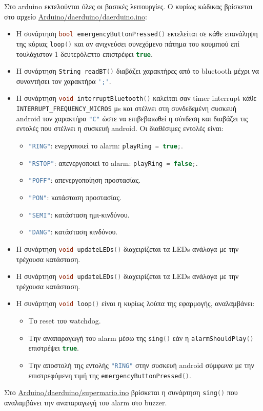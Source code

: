 Στο arduino εκτελούνται όλες οι βασικές λειτουργίες.
Ο κυρίως κώδικας βρίσκεται στο αρχείο \url{Arduino/daerduino/daerduino.ino}:
\begin{itemize}
\item \sloppy Η συνάρτηση \lstinline[language=C++]!bool emergencyButtonPressed()! εκτελείται σε κάθε επανάληψη της κύριας \lstinline[language=C++]!loop()! και αν ανιχνεύσει συνεχόμενο πάτημα του κουμπιού επί τουλάχιστον 1 δευτερόλεπτο επιστρέφει \lstinline[language=C++]!true!.

\item Η συνάρτηση \lstinline[language=C++]!String readBT()! διαβάζει χαρακτήρες από το bluetooth μέχρι να συναντήσει τον χαρακτήρα \lstinline[language=C++]!';'!.

\item \sloppy Η συνάρτηση \lstinline[language=C++]!void interruptBluetooth()! καλείται σαν timer interrupt
κάθε \lstinline[language=C++]!INTERRUPT_FREQUENCY_MICROS! \si{\micro\second}
και στέλνει στη συνδεδεμένη συσκευή android τον χαρακτήρα \lstinline[language=C++]!"C"! ώστε να επιβεβαιωθεί η σύνδεση και διαβάζει τις εντολές που στέλνει η συσκευή android.
Οι διαθέσιμες εντολές είναι:
\begin{itemize}
\item \lstinline[language=C++]!"RING"!: ενεργοποιεί το alarm: \lstinline[language=C++]!playRing = true;!.
\item \lstinline[language=C++]!"RSTOP"!: απενεργοποιεί το alarm: \lstinline[language=C++]!playRing = false;!.
\item \lstinline[language=C++]!"POFF"!: απενεργοποίηση προστασίας.
\item \lstinline[language=C++]!"PON"!: κατάσταση προστασίας.
\item \lstinline[language=C++]!"SEMI"!: κατάσταση ημι-κινδύνου.
\item \lstinline[language=C++]!"DANG"!: κατάσταση κινδύνου.
\end{itemize}

\item Η συνάρτηση \lstinline[language=C++]!void updateLEDs()! διαχειρίζεται τα LEDs ανάλογα με την τρέχουσα κατάσταση.

\item Η συνάρτηση \lstinline[language=C++]!void updateLEDs()! διαχειρίζεται τα LEDs ανάλογα με την τρέχουσα κατάσταση.

\item Η συνάρτηση \lstinline[language=C++]!void loop()! είναι η κυρίως λούπα της εφαρμογής, αναλαμβάνει:
\begin{itemize}
\item Το reset του watchdog.
\item Την αναπαραγωγή του alarm μέσω της \lstinline[language=C++]!sing()! εάν η \lstinline[language=C++]!alarmShouldPlay()! επιστρέψει \lstinline[language=C++]!true!.
\item Την αποστολή της εντολής \lstinline[language=C++]!"RING"! στην συσκευή android σύμφωνα με την επιστρεφόμενη τιμή της \lstinline[language=C++]!emergencyButtonPressed()!.
\end{itemize}
\end{itemize}

Στο \url{Arduino/daerduino/supermario.ino}
βρίσκεται η συνάρτηση \lstinline[language=C++]!sing()! που αναλαμβάνει την αναπαραγωγή του alarm στο buzzer.
